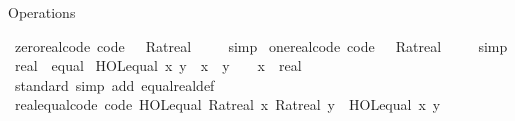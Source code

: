\begin{isabellebody}
\endisatagproof
{\isafoldproof}%
%
\isadelimproof
%
\endisadelimproof
%
\begin{isamarkuptext}%
Operations%
\end{isamarkuptext}\isamarkuptrue%
\isamarkupfalse%
\ zero{\isacharunderscore}{\kern0pt}real{\isacharunderscore}{\kern0pt}code\ {\isacharbrackleft}{\kern0pt}code{\isacharbrackright}{\kern0pt}{\isacharcolon}{\kern0pt}\ {\isachardoublequoteopen}{}\ {\isacharequal}{\kern0pt}\ Ratreal\ {}{\isachardoublequoteclose}\isanewline
%
\isadelimproof
\ \ %
\endisadelimproof
%
\isatagproof
{}\isamarkupfalse%
\ simp%
\endisatagproof
{\isafoldproof}%
%
\isadelimproof
\isanewline
%
\endisadelimproof
\isanewline
{}\isamarkupfalse%
\ one{\isacharunderscore}{\kern0pt}real{\isacharunderscore}{\kern0pt}code\ {\isacharbrackleft}{\kern0pt}code{\isacharbrackright}{\kern0pt}{\isacharcolon}{\kern0pt}\ {\isachardoublequoteopen}{}\ {\isacharequal}{\kern0pt}\ Ratreal\ {}{\isachardoublequoteclose}\isanewline
%
\isadelimproof
\ \ %
\endisadelimproof
%
\isatagproof
{}\isamarkupfalse%
\ simp%
\endisatagproof
{\isafoldproof}%
%
\isadelimproof
\isanewline
%
\endisadelimproof
\isanewline
{}\isamarkupfalse%
\ real\ {\isacharcolon}{\kern0pt}{\isacharcolon}{\kern0pt}\ equal\isanewline
{}\isanewline
\isanewline
{}\isamarkupfalse%
\ {\isachardoublequoteopen}HOL{\isachardot}{\kern0pt}equal\ x\ y\ {\isasymlongleftrightarrow}\ x\ {\isacharminus}{\kern0pt}\ y\ {\isacharequal}{\kern0pt}\ {}{\isachardoublequoteclose}\ \ x\ {\isacharcolon}{\kern0pt}{\isacharcolon}{\kern0pt}\ real\isanewline
\isanewline
{}\isamarkupfalse%
%
\isadelimproof
\ %
\endisadelimproof
%
\isatagproof
{}\isamarkupfalse%
\ standard\ {\isacharparenleft}{\kern0pt}simp\ add{\isacharcolon}{\kern0pt}\ equal{\isacharunderscore}{\kern0pt}real{\isacharunderscore}{\kern0pt}def{\isacharparenright}{\kern0pt}%
\endisatagproof
{\isafoldproof}%
%
\isadelimproof
%
\endisadelimproof
\isanewline
\isanewline
{}\isamarkupfalse%
\ real{\isacharunderscore}{\kern0pt}equal{\isacharunderscore}{\kern0pt}code\ {\isacharbrackleft}{\kern0pt}code{\isacharbrackright}{\kern0pt}{\isacharcolon}{\kern0pt}\ {\isachardoublequoteopen}HOL{\isachardot}{\kern0pt}equal\ {\isacharparenleft}{\kern0pt}Ratreal\ x{\isacharparenright}{\kern0pt}\ {\isacharparenleft}{\kern0pt}Ratreal\ y{\isacharparenright}{\kern0pt}\ {\isasymlongleftrightarrow}\ HOL{\isachardot}{\kern0pt}equal\ x\ y{\isachardoublequoteclose}\isanewline

\end{isabellebody}
